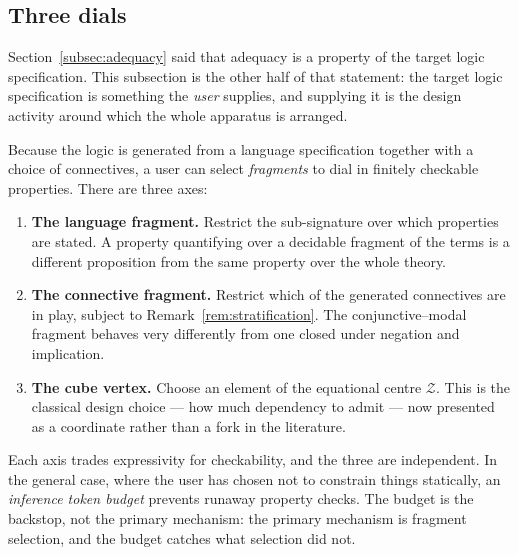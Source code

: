 \documentclass[11pt]{article}
\theoremstyle{definition}
\theoremstyle{plain}
\theoremstyle{remark}
\newcommand{\Zc}{\mathcal{Z}}
\begin{document}
\subsection{Three dials}
\label{subsec:dials}

Section~\ref{subsec:adequacy} said that adequacy is a property of the target logic
specification. This subsection is the other half of that statement: the target logic
specification is something the \emph{user} supplies, and supplying it is the design
activity around which the whole apparatus is arranged.

Because the logic is generated from a language specification together with a choice of
connectives, a user can select \emph{fragments} to dial in finitely checkable properties.
There are three axes:

\begin{enumerate}[label=(\arabic*),leftmargin=2.5em]
  \item \textbf{The language fragment.} Restrict the sub-signature over which properties
    are stated. A property quantifying over a decidable fragment of the terms is a
    different proposition from the same property over the whole theory.
  \item \textbf{The connective fragment.} Restrict which of the generated connectives are
    in play, subject to Remark~\ref{rem:stratification}. The conjunctive--modal fragment
    behaves very differently from one closed under negation and implication.
  \item \textbf{The cube vertex.} Choose an element of the equational centre $\Zc$. This
    is the classical design choice --- how much dependency to admit --- now presented as a
    coordinate rather than a fork in the literature.
\end{enumerate}

Each axis trades expressivity for checkability, and the three are independent. In the
general case, where the user has chosen not to constrain things statically, an
\emph{inference token budget} prevents runaway property checks. The budget is the backstop,
not the primary mechanism: the primary mechanism is fragment selection, and the budget
catches what selection did not.
\end{document}
